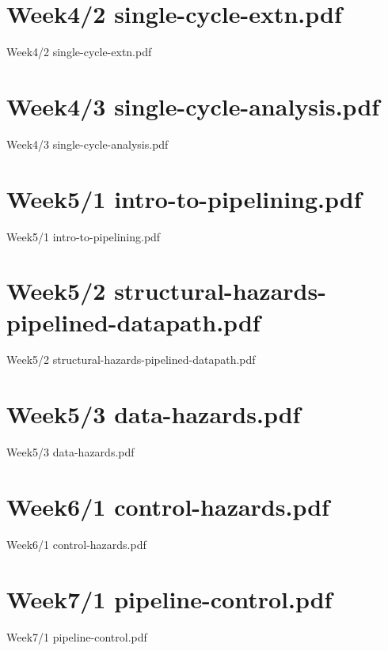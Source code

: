 \documentclass[aspectratio = 169]{beamer}
\begin{document}
\section{Week4/2 single-cycle-extn.pdf}
\begin{frame}{Week4/2 single-cycle-extn.pdf}
\end{frame}

\section{Week4/3 single-cycle-analysis.pdf}
\begin{frame}{Week4/3 single-cycle-analysis.pdf}
\end{frame}

\section{Week5/1 intro-to-pipelining.pdf}
\begin{frame}{Week5/1 intro-to-pipelining.pdf}
\end{frame}

\section{Week5/2 structural-hazards-pipelined-datapath.pdf}
\begin{frame}{Week5/2 structural-hazards-pipelined-datapath.pdf}
\end{frame}

\section{Week5/3 data-hazards.pdf}
\begin{frame}{Week5/3 data-hazards.pdf}
\end{frame}

\section{Week6/1 control-hazards.pdf}
\begin{frame}{Week6/1 control-hazards.pdf}
\end{frame}

\section{Week7/1 pipeline-control.pdf}
\begin{frame}{Week7/1 pipeline-control.pdf}
\end{frame}

\end{document}

